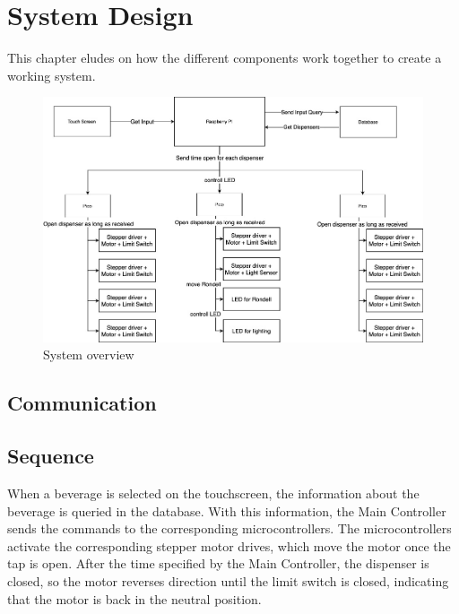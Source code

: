 \chapter{System Design}

This chapter eludes on how the different components work together to create a working system.



\begin{figure}[h]
    \centering
    \includegraphics[width=140mm]{content/figures/overview.jpg}
    \caption{System overview\label{fig:overview}}
\end{figure}




\section{Communication}



\section{Sequence}

    When a beverage is selected on the touchscreen, the information about the beverage is queried in the database. With this information, the Main Controller sends the commands to the corresponding microcontrollers. The microcontrollers activate the corresponding stepper motor drives, which move the motor once the tap is open. After the time specified by the Main Controller, the dispenser is closed, so the motor reverses direction until the limit switch is closed, indicating that the motor is back in the neutral position.
